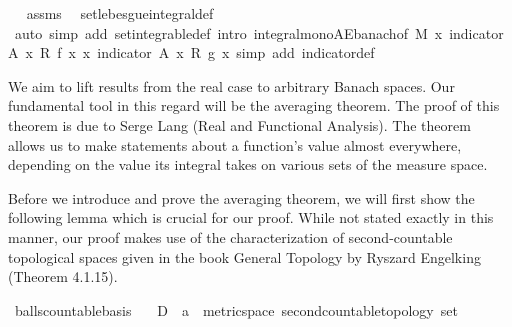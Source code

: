 \begin{isabellebody}
\isadelimproof
\ %
\endisadelimproof
%
\isatagproof
{}\isamarkupfalse%
\ assms\ \isamarkupfalse%
\ set{\isacharunderscore}{\kern0pt}lebesgue{\isacharunderscore}{\kern0pt}integral{\isacharunderscore}{\kern0pt}def\ \isamarkupfalse%
\ {\isacharparenleft}{\kern0pt}auto\ simp\ add{\isacharcolon}{\kern0pt}\ set{\isacharunderscore}{\kern0pt}integrable{\isacharunderscore}{\kern0pt}def\ intro{\isacharbang}{\kern0pt}{\isacharcolon}{\kern0pt}\ integral{\isacharunderscore}{\kern0pt}mono{\isacharunderscore}{\kern0pt}AE{\isacharunderscore}{\kern0pt}banach{\isacharbrackleft}{\kern0pt}of\ M\ {\isachardoublequoteopen}{\isasymlambda}x{\isachardot}{\kern0pt}\ indicator\ A\ x\ {\isacharasterisk}{\kern0pt}\isactrlsub R\ f\ x{\isachardoublequoteclose}\ {\isachardoublequoteopen}{\isasymlambda}x{\isachardot}{\kern0pt}\ indicator\ A\ x\ {\isacharasterisk}{\kern0pt}\isactrlsub R\ g\ x{\isachardoublequoteclose}{\isacharbrackright}{\kern0pt}{\isacharcomma}{\kern0pt}\ simp\ add{\isacharcolon}{\kern0pt}\ indicator{\isacharunderscore}{\kern0pt}def{\isacharparenright}{\kern0pt}%
\endisatagproof
{\isafoldproof}%
%
\isadelimproof
%
\endisadelimproof
%
\isadelimdocument
%
\endisadelimdocument
%
\isatagdocument
%
\isamarkuptrue%
%
\endisatagdocument
{\isafolddocument}%
%
\isadelimdocument
%
\endisadelimdocument
%
\begin{isamarkuptext}%
We aim to lift results from the real case to arbitrary Banach spaces. 
      Our fundamental tool in this regard will be the averaging theorem. The proof of this theorem is due to Serge Lang (Real and Functional Analysis). 
      The theorem allows us to make statements about a function’s value almost everywhere, depending on the value its integral takes on various sets of the measure space.%
\end{isamarkuptext}\isamarkuptrue%
%
\begin{isamarkuptext}%
Before we introduce and prove the averaging theorem, we will first show the following lemma which is crucial for our proof. 
      While not stated exactly in this manner, our proof makes use of the characterization of second-countable topological spaces given in the book General Topology by Ryszard Engelking (Theorem 4.1.15).%
\end{isamarkuptext}\isamarkuptrue%
\isamarkupfalse%
\ balls{\isacharunderscore}{\kern0pt}countable{\isacharunderscore}{\kern0pt}basis{\isacharcolon}{\kern0pt}\isanewline
\ \ \ D\ {\isacharcolon}{\kern0pt}{\isacharcolon}{\kern0pt}\ {\isachardoublequoteopen}{\isacharprime}{\kern0pt}a\ {\isacharcolon}{\kern0pt}{\isacharcolon}{\kern0pt}\ {\isacharbraceleft}{\kern0pt}metric{\isacharunderscore}{\kern0pt}space{\isacharcomma}{\kern0pt}\ second{\isacharunderscore}{\kern0pt}countable{\isacharunderscore}{\kern0pt}topology{\isacharbraceright}{\kern0pt}\ set{\isachardoublequoteclose}\ \isanewline

\end{isabellebody}
